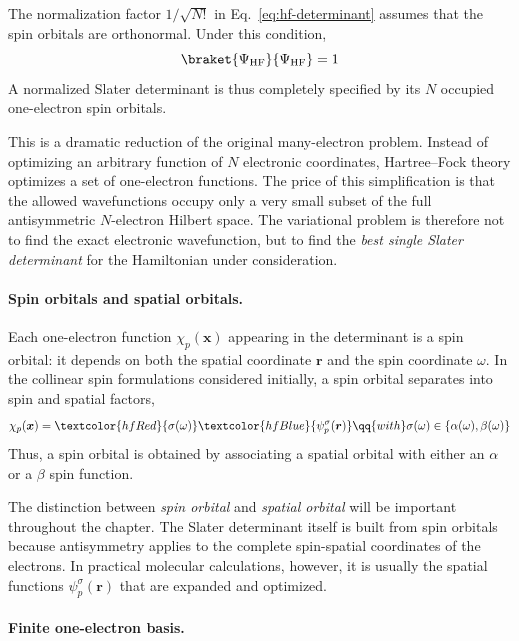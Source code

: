 \documentclass[11pt,a4paper,titlepage]{article}
\numberwithin{equation}{section}
\newcommand{\br}{\boldsymbol{r}}
\newcommand{\bx}{\boldsymbol{x}}
\newcommand{\red}[1]{\textcolor{hfRed}{#1}}
\newcommand{\blue}[1]{\textcolor{hfBlue}{#1}}
\begin{document}
The normalization factor $1/\sqrt{N!}$ in
Eq.~\eqref{eq:hf-determinant} assumes that the spin orbitals are
orthonormal. Under this condition,
\begin{equation}
  \braket{\Psi_\text{HF}}{\Psi_\text{HF}}=1
\end{equation}
A normalized Slater determinant is thus completely specified by its $N$
occupied one-electron spin orbitals.

This is a dramatic reduction of the original many-electron problem. Instead
of optimizing an arbitrary function of $N$ electronic coordinates, Hartree--Fock theory
optimizes a set of one-electron functions. The price of this simplification
is that the allowed wavefunctions occupy only a very small subset of the
full antisymmetric $N$-electron Hilbert space. The variational problem is
therefore not to find the exact electronic wavefunction, but to find the
\emph{best single Slater determinant} for the Hamiltonian under
consideration.

\paragraph{Spin orbitals and spatial orbitals.}

Each one-electron function $\chi_p(\bx)$ appearing in the determinant is a
spin orbital: it depends on both the spatial coordinate $\br$ and the
spin coordinate $\omega$. In the collinear spin formulations considered
initially, a spin orbital separates into spin and spatial factors,
\begin{equation}
  \chi_p(\bx)
  =
  \red{\sigma(\omega)}
  \blue{\psi_p^\sigma(\br)}
  \qq{with}
  \sigma(\omega)\in\{\alpha(\omega),\beta(\omega)\}
  \label{eq:spin-orbital-factorization}
\end{equation}
Thus, a spin orbital is obtained by associating a spatial orbital with either
an $\alpha$ or a $\beta$ spin function.

The distinction between \emph{spin orbital} and \emph{spatial orbital} will
be important throughout the chapter. The Slater determinant itself is built
from spin orbitals because antisymmetry applies to the complete
spin-spatial coordinates of the electrons. In practical molecular
calculations, however, it is usually the spatial functions
$\psi_p^\sigma(\br)$ that are expanded and optimized.

\paragraph{Finite one-electron basis.}
\end{document}
